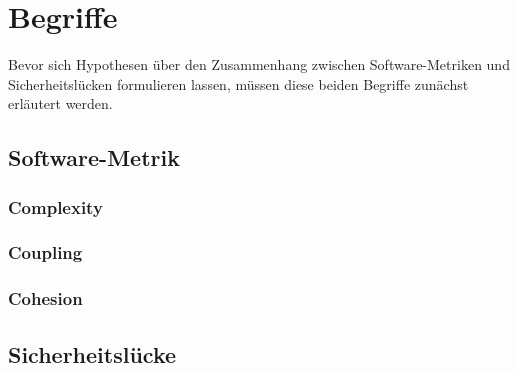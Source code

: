 \section{Begriffe}
\label{sec:begriffe}
Bevor sich Hypothesen über den Zusammenhang zwischen Software-Metriken und Sicherheitslücken formulieren lassen, müssen diese beiden Begriffe zunächst erläutert werden.
\subsection{Software-Metrik}

\subsubsection{Complexity}
\subsubsection{Coupling}
\subsubsection{Cohesion}

\subsection{Sicherheitslücke}



